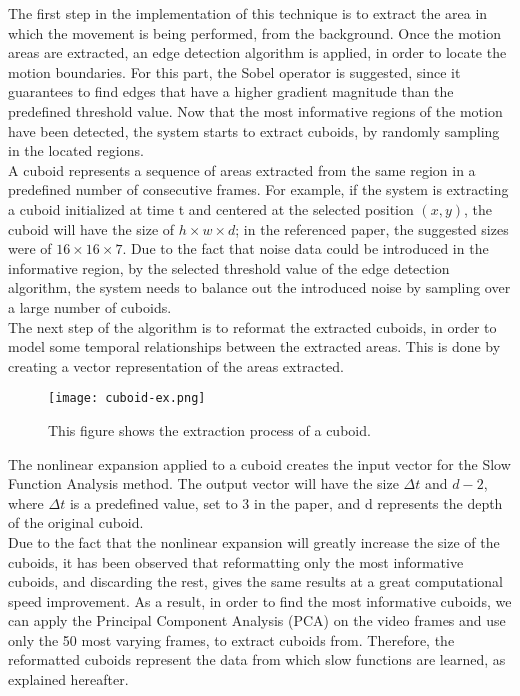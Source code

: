 \documentclass[11pt]{report}
\begin{document}
The first step in the implementation of this technique is to extract the area in which the movement is being performed, from the background. Once the motion areas are extracted, an edge detection algorithm is applied, in order to locate the motion boundaries. For this part, the Sobel operator is suggested, since it guarantees to find edges that have a higher gradient magnitude than the predefined threshold value.  Now that the most informative regions of the motion have been detected, the system starts to extract cuboids, by randomly sampling in the located regions.\\

A cuboid represents a sequence of areas extracted from the same region in a predefined number of consecutive frames. For example, if the system is extracting a cuboid initialized at time t and centered at the selected position \((x,y)\), the cuboid will have the size of \(h \times w \times d\); in the referenced paper, the suggested sizes were of \(16 \times 16 \times 7\).  Due to the fact that noise data could be introduced in the informative region, by the selected threshold value of the edge detection algorithm, the system needs to balance out the introduced noise by sampling over a large number of cuboids. \\
The next step of the algorithm is to reformat the extracted cuboids, in order to model some temporal relationships between the extracted areas. This is done by creating a vector representation of the areas extracted.\\

\begin{figure}
    \centering
    \texttt{[image: cuboid-ex.png]}
    \caption{This figure shows the extraction process of a cuboid.} 
    \label{fig:cuboid-ex}
\end{figure}

The nonlinear expansion applied to a cuboid creates the input vector for the Slow Function Analysis method. The output vector will have the size \(\Delta t\) and \(d-2\), where \(\Delta t\) is a predefined value, set to 3 in the paper, and d represents the depth of the original cuboid.\\
Due to the fact that the nonlinear expansion will greatly increase the size of the cuboids, it has been observed that reformatting only the most informative cuboids, and discarding the rest, gives the same results at a great computational speed improvement. As a result, in order to find the most informative cuboids, we can apply the Principal Component Analysis (PCA) on the video frames and use only the 50 most varying frames, to extract cuboids from. Therefore, the reformatted cuboids represent the data from which slow functions are learned, as explained hereafter. \\
\end{document}
